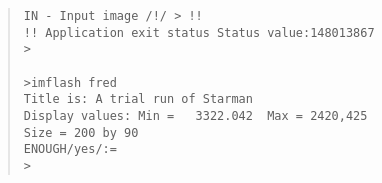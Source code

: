 {\begin{quote}
\begin{tabbing}
\verb#IN - Input image /!/ > !!                                                   # \\
\verb#!! Application exit status Status value:148013867                           # \\
\verb#>                                                            #\\
\verb#                                                             #\\
\verb#>imflash fred                                                               # \\
\verb#Title is: A trial run of Starman                                            # \\
\verb#Display values: Min =   3322.042  Max = 2420,425                           #\\
\verb#Size = 200 by 90                                                           #\\
\verb#ENOUGH/yes/:=                                                               # \\
\verb#>                                                            #\\
\end{tabbing}
\end{quote}
} 

\newpage
 

